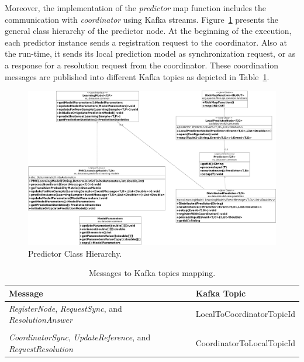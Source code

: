 \par Moreover, the implementation of the \textit{predictor} map function includes the communication  with \textit{coordinator} using Kafka streams.
Figure~\ref{fig:class_diagram} presents the general class hierarchy of the predictor node. At the beginning of the execution,  each predictor instance sends a registration request to the coordinator. Also at the run-time,  it sends  its local prediction model as synchronization request,  or as a response for a resolution request from the coordinator. These coordination messages are published into different Kafka topics as depicted in Table~\ref{tab:messagesToTopics}. 
 
 
 \begin{figure}[H]
 	\centering
 	\includegraphics[width=\textwidth,height=\linewidth]{chapters/figures/predictor_diagram.png}
 	
 	\caption{Predictor Class Hierarchy.}
 	\label{fig:class_diagram}
 \end{figure}

 
\begin{center}
\centering
\begin{table}[h]
	\caption{Messages to Kafka topics mapping.}
	\label{tab:messagesToTopics}
	\begin{tabular}{p{8cm}l}
		\toprule
		Message &Kafka Topic\\
		\midrule
		\parbox[t]{8cm}{\textit{RegisterNode}, \textit{RequestSync},  and \textit{ResolutionAnswer} } & LocalToCoordinatorTopicId\\ \\
		
			  \parbox[t]{8cm}{\textit{CoordinatorSync}, \textit{UpdateReference}, and \\ \textit{RequestResolution}} & CoordinatorToLocalTopicId\\
		\bottomrule
	\end{tabular}
\end{table}

\end{center}

